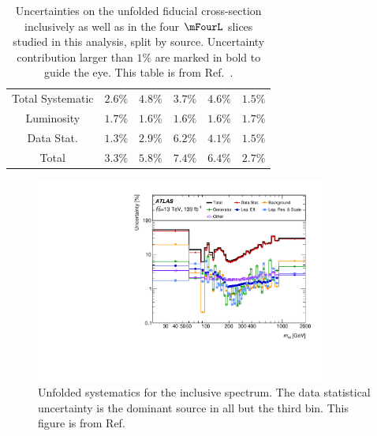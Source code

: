 \begin{table}
\begin{tabular} {c  c  c  c  c  c }
        \hline 
        Total Systematic &  $ 2.6\% $  &  $ 4.8\% $  &  $ 3.7\% $  &  $ 4.6\% $  &  $ 1.5\% $ \\
        Luminosity &  $ \mathbf{1.7}\% $  &  $ \mathbf{1.6}\% $  &  $ \mathbf{1.6}\% $  &  $ \mathbf{1.6}\% $  &  $ \mathbf{1.7}\% $ \\
        Data Stat. &  $ \mathbf{1.3}\% $  &  $ \mathbf{2.9}\% $  &  $ \mathbf{6.2}\% $  &  $ \mathbf{4.1}\% $  &  $ \mathbf{1.5}\% $ \\
        \hline 
        Total &  $ 3.3\% $  &  $ 5.8\% $  &  $ 7.4\% $  &  $ 6.4\% $  &  $ 2.7\% $ \\
        \hline 
     \end{tabular}
    \caption{Uncertainties on the unfolded fiducial cross-section inclusively as well as in the four $\mFourL$ slices studied in this analysis, split by source. Uncertainty contribution larger than $1\%$ are marked in bold to guide the eye. This table is from Ref.~\cite{m4l_internalnote}. \label{tab:SysTablePerSlice} }
\end{table}

\begin{figure}
    \centering
    \includegraphics[width=0.85\textwidth]{Figures/m4l/Systematics/UnfoldedSys_M4l_Stack_Paper.pdf}
    \caption{Unfolded systematics for the inclusive \mFourL spectrum. The data statistical uncertainty is the dominant source in all but the third bin. This figure is from Ref.~\cite{m4l2021_paper}}
    \label{fig:m4lsystematics}
\end{figure}